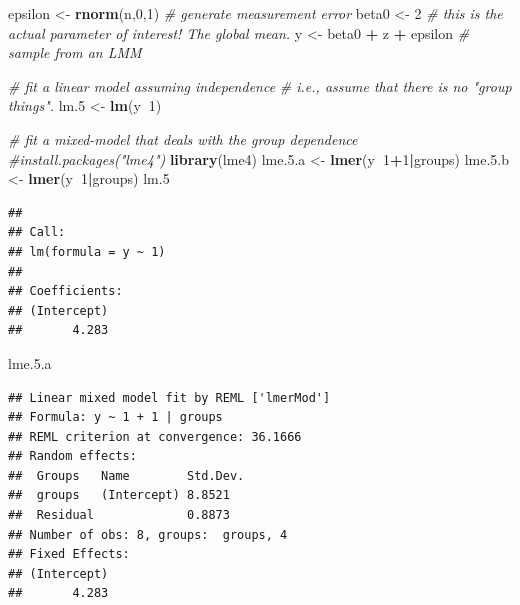 \documentclass[]{book}
\newenvironment{Shaded}{\begin{snugshade}}{\end{snugshade}}
\newcommand{\KeywordTok}[1]{\textcolor[rgb]{0.13,0.29,0.53}{\textbf{#1}}}
\newcommand{\DecValTok}[1]{\textcolor[rgb]{0.00,0.00,0.81}{#1}}
\newcommand{\FloatTok}[1]{\textcolor[rgb]{0.00,0.00,0.81}{#1}}
\newcommand{\StringTok}[1]{\textcolor[rgb]{0.31,0.60,0.02}{#1}}
\newcommand{\CommentTok}[1]{\textcolor[rgb]{0.56,0.35,0.01}{\textit{#1}}}
\newcommand{\OperatorTok}[1]{\textcolor[rgb]{0.81,0.36,0.00}{\textbf{#1}}}
\newcommand{\NormalTok}[1]{#1}
\begin{document}
\begin{Shaded}
\begin{Highlighting}[]
\NormalTok{epsilon <-}\StringTok{ }\KeywordTok{rnorm}\NormalTok{(n,}\DecValTok{0}\NormalTok{,}\DecValTok{1}\NormalTok{) }\CommentTok{# generate measurement error}
\NormalTok{beta0 <-}\StringTok{ }\DecValTok{2} \CommentTok{# this is the actual parameter of interest! The global mean.}
\NormalTok{y <-}\StringTok{ }\NormalTok{beta0 }\OperatorTok{+}\StringTok{ }\NormalTok{z }\OperatorTok{+}\StringTok{ }\NormalTok{epsilon }\CommentTok{# sample from an LMM}

\CommentTok{# fit a linear model assuming independence}
\CommentTok{# i.e., assume that there is no "group things".}
\NormalTok{lm.}\DecValTok{5}\NormalTok{ <-}\StringTok{ }\KeywordTok{lm}\NormalTok{(y}\OperatorTok{~}\DecValTok{1}\NormalTok{)}

\CommentTok{# fit a mixed-model that deals with the group dependence}
\CommentTok{#install.packages("lme4")}
\KeywordTok{library}\NormalTok{(lme4)}
\NormalTok{lme.}\FloatTok{5.}\NormalTok{a <-}\StringTok{ }\KeywordTok{lmer}\NormalTok{(y}\OperatorTok{~}\DecValTok{1}\OperatorTok{+}\DecValTok{1}\OperatorTok{|}\NormalTok{groups) }
\NormalTok{lme.}\FloatTok{5.}\NormalTok{b <-}\StringTok{ }\KeywordTok{lmer}\NormalTok{(y}\OperatorTok{~}\DecValTok{1}\OperatorTok{|}\NormalTok{groups) }
\NormalTok{lm.}\DecValTok{5}
\end{Highlighting}
\end{Shaded}

\begin{verbatim}
## 
## Call:
## lm(formula = y ~ 1)
## 
## Coefficients:
## (Intercept)  
##       4.283
\end{verbatim}

\begin{Shaded}
\begin{Highlighting}[]
\NormalTok{lme.}\FloatTok{5.}\NormalTok{a }
\end{Highlighting}
\end{Shaded}

\begin{verbatim}
## Linear mixed model fit by REML ['lmerMod']
## Formula: y ~ 1 + 1 | groups
## REML criterion at convergence: 36.1666
## Random effects:
##  Groups   Name        Std.Dev.
##  groups   (Intercept) 8.8521  
##  Residual             0.8873  
## Number of obs: 8, groups:  groups, 4
## Fixed Effects:
## (Intercept)  
##       4.283
\end{verbatim}
\end{document}
